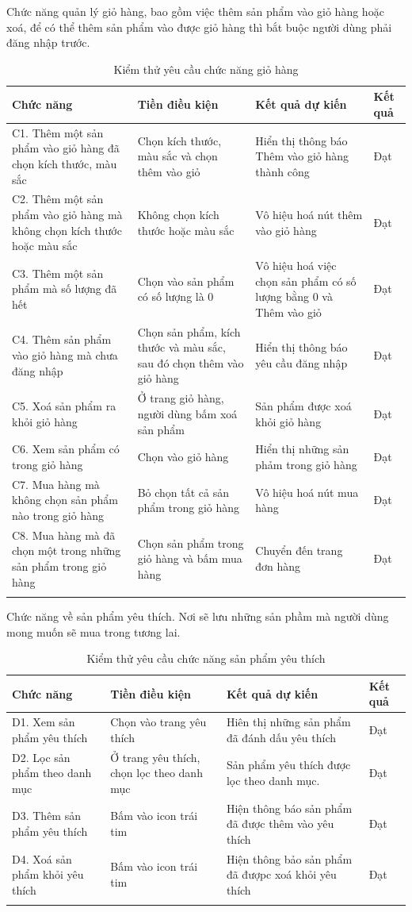 \noindent Chức năng quản lý giỏ hàng, bao gồm việc thêm sản phẩm vào giỏ hàng hoặc xoá, để có thể thêm sản phẩm vào được giỏ hàng thì bắt buộc người dùng phải đăng nhập trước.

\begin{longtable}{|p{4cm}|p{4cm}|p{4cm}|p{2cm}|}
    \hline
    Chức năng & Tiền điều kiện & Kết quả dự kiến & Kết quả \\
    \hline
    C1. Thêm một sản phẩm vào giỏ hàng đã chọn kích thước, màu sắc  & Chọn kích thước, màu sắc và chọn thêm vào giỏ & Hiển thị thông báo Thêm vào giỏ hàng thành công  & Đạt\\
    \hline
    C2. Thêm một sản phẩm vào giỏ hàng mà không chọn kích thước hoặc màu sắc & Không chọn kích thước hoặc màu sắc & Vô hiệu hoá nút thêm vào giỏ hàng & Đạt\\
    \hline
    C3. Thêm một sản phẩm mà số lượng đã hết & Chọn vào sản phẩm có số lượng là 0 & Vô hiệu hoá việc chọn sản phẩm có số lượng bằng 0 và Thêm vào giỏ & Đạt\\
    \hline
    C4. Thêm sản phẩm vào giỏ hàng mà chưa đăng nhập & Chọn sản phẩm, kích thước và màu sắc, sau đó chọn thêm vào giỏ hàng & Hiển thị thông báo yêu cầu đăng nhập & Đạt \\
    \hline
    C5. Xoá sản phẩm ra khỏi giỏ hàng & Ở trang giỏ hàng, người dùng bấm xoá sản phẩm & Sản phẩm được xoá khỏi giỏ hàng  & Đạt \\
    \hline
    C6. Xem sản phẩm có trong giỏ hàng & Chọn vào giỏ hàng & Hiển thị những sản phảm trong giỏ hàng & Đạt \\
    \hline
    C7. Mua hàng mà không chọn sản phẩm nào trong giỏ hàng & Bỏ chọn tất cả sản phẩm trong giỏ hàng & Vô hiệu hoá nút mua hàng & Đạt \\
    \hline
    C8. Mua hàng mà đã chọn một trong những sản phẩm trong giỏ hàng & Chọn sản phẩm trong giỏ hàng và bấm mua hàng & Chuyển đến trang đơn hàng & Đạt \\
    \hline
    \caption{Kiểm thử yêu cầu chức năng giỏ hàng}
\end{longtable}

\noindent Chức năng về sản phẩm yêu thích. Nơi sẽ lưu những sản phầm mà người dùng mong muốn sẽ mua trong tương lai.
\begin{longtable}{|p{4cm}|p{4cm}|p{4cm}|p{2cm}|}
    \hline
    Chức năng & Tiền điều kiện & Kết quả dự kiến & Kết quả \\
    \hline
    D1. Xem sản phẩm yêu thích & Chọn vào trang yêu thích & Hiên thị những sản phẩm đã đánh dấu yêu thích & Đạt \\
    \hline
    D2. Lọc sản phẩm theo danh mục & Ở trang yêu thích, chọn lọc theo danh mục & Sản phẩm yêu thích được lọc theo danh mục. & Đạt \\
    \hline
    D3. Thêm sản phẩm yêu thích & Bấm vào icon trái tim  & Hiện thông báo sản phẩm đã được thêm vào yêu thích & Đạt \\
    \hline
    D4. Xoá sản phẩm khỏi yêu thích & Bấm vào icon trái tim & Hiện thông bảo sản phẩm đã đượpc xoá khỏi yêu thích & Đạt \\
    \hline
    \caption{Kiểm thử yêu cầu chức năng sản phẩm yêu thích}
\end{longtable}




